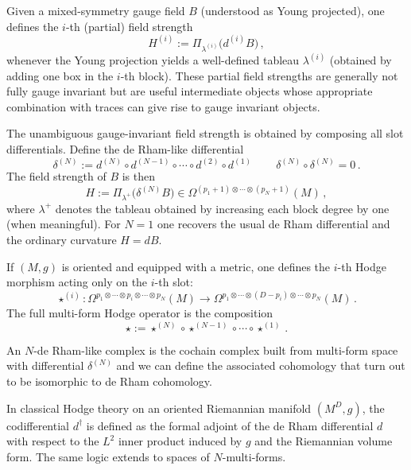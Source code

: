 \documentclass[a4paper,12pt]{article}
\begin{document}
Given a mixed-symmetry gauge field $B$ (understood as Young projected), one defines the $i$-th (partial) field strength
\begin{equation}\label{eq:partial-field-strength}
H^{(i)}:=\Pi_{\lambda^{(i)}}\bigl(d^{(i)}B\bigr)\, ,
\end{equation}
whenever the Young projection yields a well-defined tableau $\lambda^{(i)}$ (obtained by adding one box in the $i$-th block).
These partial field strengths are generally not fully gauge invariant but are useful intermediate objects whose appropriate combination with traces can give rise to gauge invariant objects.

The unambiguous gauge-invariant field strength is obtained by composing all slot differentials.
Define the de Rham-like differential
\begin{equation}\label{eq:deRham-like-differential}
\delta^{(N)}:= d^{(N)}\circ d^{(N-1)}\circ\cdots\circ d^{(2)}\circ d^{(1)}\, \qquad \delta^{(N)}\circ\delta^{(N)}=0\,.
\end{equation}
The field strength of $B$ is then
\begin{equation}\label{eq:full-field-strength}
H:=\Pi_{\lambda^{+}}\bigl(\delta^{(N)}B\bigr)\in
\Omega^{(p_1+1)\otimes\cdots\otimes(p_N+1)}(M)\, ,
\end{equation}
where $\lambda^{+}$ denotes the tableau obtained by increasing each block degree by one (when meaningful).
For $N=1$ one recovers the usual de Rham differential and the ordinary curvature $H=dB$.

If $(M,g)$ is oriented and equipped with a metric, one defines the $i$-th Hodge morphism acting only on the $i$-th slot:
\begin{equation}\label{eq:ith-hodge}
\star^{(i)}:\Omega^{p_1\otimes\cdots\otimes p_i\otimes\cdots\otimes p_N}(M)
\longrightarrow
\Omega^{p_1\otimes\cdots\otimes (D-p_i)\otimes\cdots\otimes p_N}(M)\, .
\end{equation}
The full multi-form Hodge operator is the composition
\begin{equation}\label{eq:full-hodge}
\star := \star^{(N)}\circ\star^{(N-1)}\circ\cdots\circ\star^{(1)}\, .
\end{equation}

An $N$-de Rham-like complex is the cochain complex built from multi-form space with differential $\delta^{(N)}$ and we can define the associated cohomology that turn out to be isomorphic to de Rham cohomology.

In classical Hodge theory on an oriented Riemannian manifold $(M^{D},g)$, the codifferential $d^{\dagger}$ is defined as the formal adjoint of the de Rham differential $d$ with respect to the $L^{2}$ inner product induced by $g$ and the Riemannian volume form. The same logic extends to spaces of $N$-multi-forms.
\end{document}
